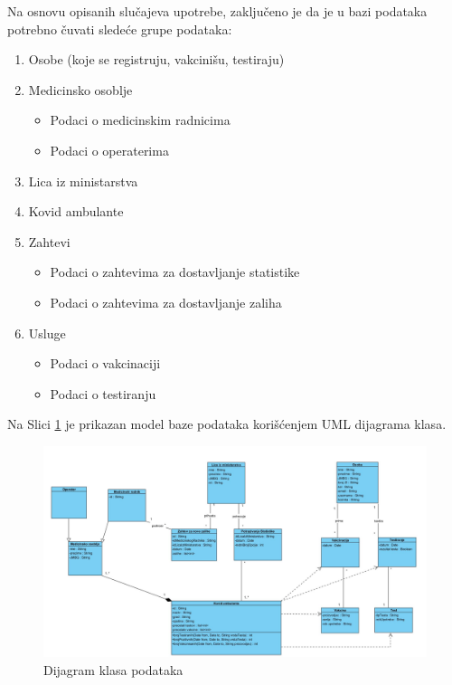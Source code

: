 \documentclass[titlepage]{article}
\begin{document}
Na osnovu opisanih slučajeva upotrebe, zaključeno je da je u bazi podataka potrebno čuvati sledeće grupe podataka:

\begin{enumerate}
    \item Osobe (koje se registruju, vakcinišu, testiraju)
    \item Medicinsko osoblje
    \begin{itemize}
        \item Podaci o medicinskim radnicima
        \item Podaci o operaterima
    \end{itemize}
    \item Lica iz ministarstva
    \item Kovid ambulante
    \item Zahtevi
    \begin{itemize}
        \item Podaci o zahtevima za dostavljanje statistike
        \item Podaci o zahtevima za dostavljanje zaliha
    \end{itemize}
    \item Usluge
    \begin{itemize}
        \item Podaci o vakcinaciji
        \item Podaci o testiranju
    \end{itemize}
\end{enumerate}

Na Slici \ref{slk:dijagram_klasa} je prikazan model baze podataka korišćenjem UML dijagrama klasa.
\begin{figure}[H]
	\centering
	\includegraphics[scale=0.3]{Dijagrami_slike/Dijagram_klasa_podataka.JPG}
	\caption{Dijagram klasa podataka}
	\label{slk:dijagram_klasa}
\end{figure}
\end{document}
